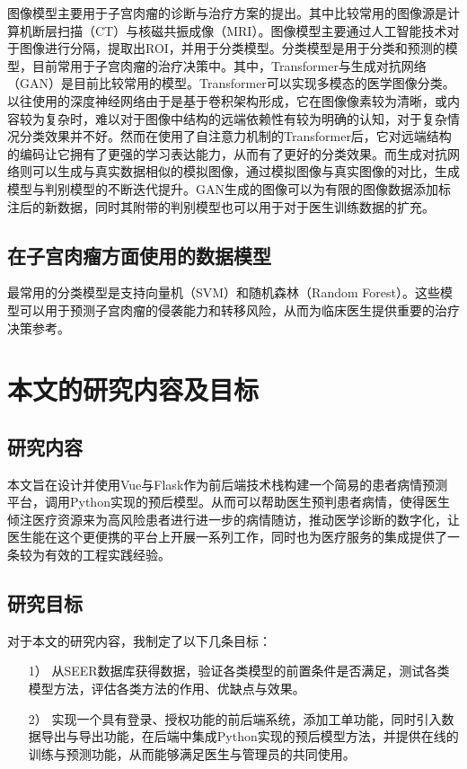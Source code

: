 图像模型主要用于子宫肉瘤的诊断与治疗方案的提出。其中比较常用的图像源是计算机断层扫描（CT）与核磁共振成像（MRI）。图像模型主要通过人工智能技术对于图像进行分隔，提取出ROI，并用于分类模型。分类模型是用于分类和预测的模型，目前常用于子宫肉瘤的治疗决策中。其中，Transformer与生成对抗网络（GAN）是目前比较常用的模型。Transformer可以实现多模态的医学图像分类。以往使用的深度神经网络由于是基于卷积架构形成，它在图像像素较为清晰，或内容较为复杂时，难以对于图像中结构的远端依赖性有较为明确的认知，对于复杂情况分类效果并不好。然而在使用了自注意力机制的Transformer后，它对远端结构的编码让它拥有了更强的学习表达能力，从而有了更好的分类效果。而生成对抗网络则可以生成与真实数据相似的模拟图像，通过模拟图像与真实图像的对比，生成模型与判别模型的不断迭代提升。GAN生成的图像可以为有限的图像数据添加标注后的新数据，同时其附带的判别模型也可以用于对于医生训练数据的扩充。

\subsection{在子宫肉瘤方面使用的数据模型}

最常用的分类模型是支持向量机（SVM）和随机森林（Random Forest）。这些模型可以用于预测子宫肉瘤的侵袭能力和转移风险，从而为临床医生提供重要的治疗决策参考。

\section{本文的研究内容及目标}

\subsection{研究内容}

本文旨在设计并使用Vue与Flask作为前后端技术栈构建一个简易的患者病情预测平台，调用Python实现的预后模型。从而可以帮助医生预判患者病情，使得医生倾注医疗资源来为高风险患者进行进一步的病情随访，推动医学诊断的数字化，让医生能在这个更便携的平台上开展一系列工作，同时也为医疗服务的集成提供了一条较为有效的工程实践经验。

\subsection{研究目标}

对于本文的研究内容，我制定了以下几条目标：
\begin{enumerate}
    \item [1）] 从SEER数据库获得数据，验证各类模型的前置条件是否满足，测试各类模型方法，评估各类方法的作用、优缺点与效果。
    \item [2）] 实现一个具有登录、授权功能的前后端系统，添加工单功能，同时引入数据导出与导出功能，在后端中集成Python实现的预后模型方法，并提供在线的训练与预测功能，从而能够满足医生与管理员的共同使用。
\end{enumerate}


